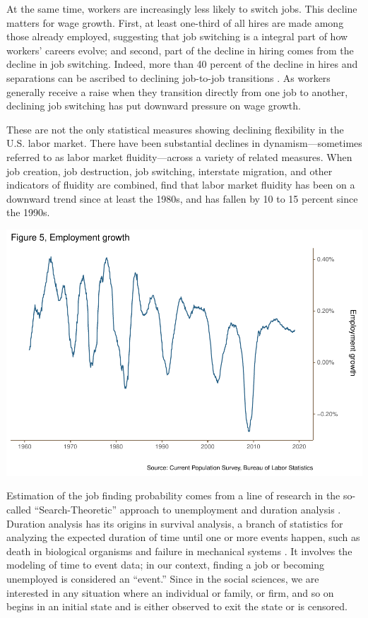 \documentclass[
  11pt,
]{article}
\begin{document}
At the same time, workers are increasingly less likely to switch jobs.
This decline matters for wage growth. First, at least one-third of all
hires are made among those already employed, suggesting that job
switching is a integral part of how workers' careers evolve; and second,
part of the decline in hiring comes from the decline in job switching.
Indeed, more than 40 percent of the decline in hires and separations can
be ascribed to declining job-to-job transitions \citep{Hyatt13}. As
workers generally receive a raise when they transition directly from one
job to another, declining job switching has put downward pressure on
wage growth.

These are not the only statistical measures showing declining
flexibility in the U.S. labor market. There have been substantial
declines in dynamism---sometimes referred to as labor market
fluidity---across a variety of related measures. When job creation, job
destruction, job switching, interstate migration, and other indicators
of fluidity are combined, \cite{Molloy16} find that labor market
fluidity has been on a downward trend since at least the 1980s, and has
fallen by 10 to 15 percent since the 1990s.

\begin{center}\includegraphics{JOLTS_files/figure-latex/unnamed-chunk-9-1} \end{center}

Estimation of the job finding probability comes from a line of research
in the so-called ``Search-Theoretic'' approach to unemployment and
duration analysis \citep{Pissarides2000}. Duration analysis has its
origins in survival analysis, a branch of statistics for analyzing the
expected duration of time until one or more events happen, such as death
in biological organisms and failure in mechanical systems
\citep{Lanc90}. It involves the modeling of time to event data; in our
context, finding a job or becoming unemployed is considered an
``event.'' Since in the social sciences, we are interested in any
situation where an individual or family, or firm, and so on begins in an
initial state and is either observed to exit the state or is censored.
\end{document}
